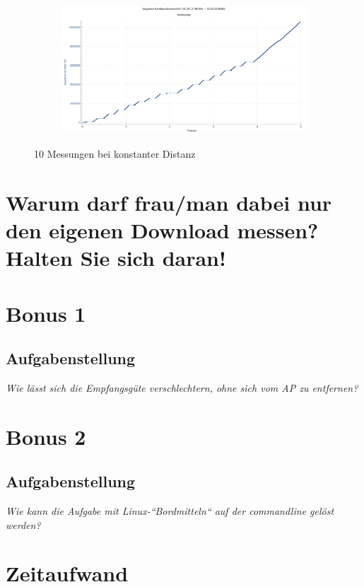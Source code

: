 \documentclass[
    pdftex,
    12pt,
    parskip=half,
    a4paper
]{scrartcl}
\begin{document}
\begin{figure}
\begin{subfigure}{0.5\textwidth}
	\end{subfigure}
	\begin{subfigure}{0.5\textwidth}
		\includegraphics[width=1\textwidth]{../1/wireshark/constant10.pdf}
	\end{subfigure}
	\caption{10 Messungen bei konstanter Distanz}
\end{figure}

\section{Warum darf frau/man dabei nur den eigenen Download messen? Halten Sie sich daran!}
\vspace{5cm}%

\section{Bonus 1}
\subsection{Aufgabenstellung}
\textit{Wie lässt sich die Empfangsgüte verschlechtern, ohne sich vom AP zu entfernen?}

\section{Bonus 2}
\subsection{Aufgabenstellung}
\textit{Wie kann die Aufgabe mit Linux-“Bordmitteln“ auf der commandline gelöst werden?}

\section{Zeitaufwand}
\end{document}

